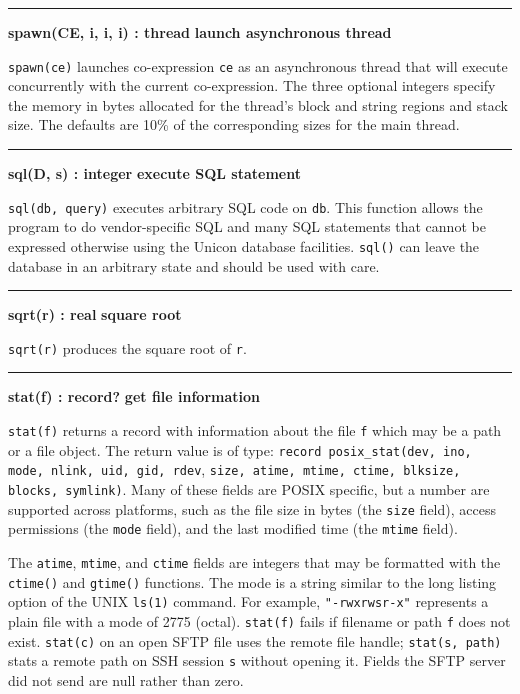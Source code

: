 \bigskip\hrule\vspace{0.1cm}
\noindent
{\bf spawn(CE, i, i, i) : thread } \hfill {\bf launch asynchronous thread}

\noindent
{}\texttt{spawn(ce)} launches co-expression \texttt{ce} as an
asynchronous thread that will execute concurrently with the current
co-expression. The three optional integers specify the memory in bytes
allocated for the thread's block and string regions and stack size.
The defaults are 10\% of the corresponding sizes for the main thread.

\bigskip\hrule\vspace{0.1cm}
\noindent
{\bf sql(D, s) : integer } \hfill {\bf execute SQL statement}

\noindent
{}\texttt{sql(db, query)} executes arbitrary SQL code on
\texttt{db}. This function allows the program to do vendor-specific SQL
and many SQL statements that cannot be expressed otherwise using the
Unicon database facilities. \texttt{sql()} can leave the database in an
arbitrary state and should be used with care.

\bigskip\hrule\vspace{0.1cm}
\noindent
{\bf sqrt(r) : real } \hfill {\bf square root}

\noindent
{}\texttt{sqrt(r)} produces the square root of
\texttt{r}.

\bigskip\hrule\vspace{0.1cm}
\noindent
{\bf stat(f) : record? } \hfill {\bf get file information}

\noindent
{}\texttt{stat(f)} returns a record
with information about the file \texttt{f} which may be a path or a
file object. The return value is of type:
\texttt{record posix\_stat(dev, ino, mode, nlink, uid, gid, rdev},
\texttt{size, atime, mtime, ctime, blksize, blocks, symlink)}.
Many of these fields are POSIX
specific, but a number are supported across platforms, such as the
file size in bytes (the \texttt{size} field), access
permissions (the \texttt{mode} field), and the last modified time (the
\texttt{mtime} field).

The \texttt{atime}, \texttt{mtime}, and \texttt{ctime} fields are
integers that may be formatted with the \texttt{ctime()} and
\texttt{gtime()} functions. The mode is a string similar to the long
listing option of the UNIX \texttt{ls(1)} command. For example,
\texttt{"-rwxrwsr-x"} represents a plain
file with a mode of 2775 (octal). \texttt{stat(f)} fails if filename or
path \texttt{f} does not exist. \texttt{stat(c)} on an open SFTP file
uses the remote file handle; \texttt{stat(s, path)} stats a remote path
on SSH session \texttt{s} without opening it. Fields the SFTP server
did not send are null rather than zero.

